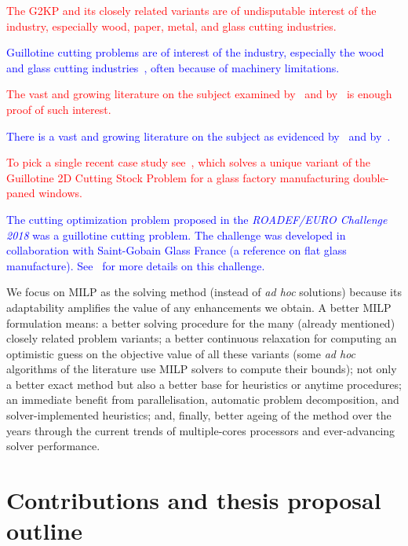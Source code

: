 \documentclass[ppgc,tese,english,formais,babel]{iiufrgs}
\newif\iffinalversion
\newcommand{\newtext}[1]{\iffinalversion%
#1%
\else%
\textcolor{blue}{#1}%
\fi%
}
\newcommand{\oldtext}[1]{\iffinalversion%
\else%
\textcolor{red}{#1}%
\fi%
}
\begin{document}
\oldtext{The G2KP and its closely related variants are of undisputable interest of the industry, especially wood, paper, metal, and glass cutting industries.}
\newtext{Guillotine cutting problems are of interest of the industry, especially the wood~\cite{yanasse:linear:2008,morabito:hardboard:2007} and glass cutting industries~\cite{clautiaux:2019,parreno:2020}, often because of machinery limitations.}
\oldtext{The vast and growing literature on the subject examined by~\citet{iori:2020} and by~\citet{russo:2020} is enough proof of such interest.}
\newtext{There is a vast and growing literature on the subject as evidenced by~\citet{iori:2020} and by~\citet{russo:2020}.}
\oldtext{To pick a single recent case study see~\citet{clautiaux:2019}, which solves a unique variant of the Guillotine 2D Cutting Stock Problem for a glass factory manufacturing double-paned windows.}
\newtext{The cutting optimization problem proposed in the \emph{ROADEF/EURO Challenge 2018} was a guillotine cutting problem. The challenge was developed in collaboration with Saint-Gobain Glass France (a reference on flat glass manufacture). See~\citet{parreno:2020} for more details on this challenge.}

We focus on MILP as the solving method (instead of \emph{ad hoc} solutions) because its adaptability amplifies the value of any enhancements we obtain.
A better MILP formulation means:
a better solving procedure for the many (already mentioned) closely related problem variants;
a better continuous relaxation for computing an optimistic guess on the objective value of all these variants (some \emph{ad hoc} algorithms of the literature use MILP solvers to compute their bounds);
not only a better exact method but also a better base for heuristics or anytime procedures;
an immediate benefit from parallelisation, automatic problem decomposition, and solver-implemented heuristics;
and, finally, better ageing of the method over the years through the current trends of multiple-cores processors and ever-advancing solver performance.

\section{Contributions and thesis proposal outline}
\end{document}
